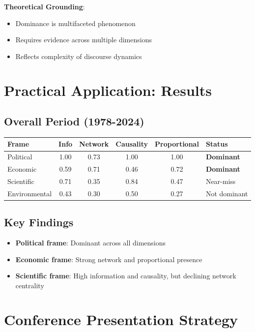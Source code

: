 \documentclass[11pt]{article}
\begin{document}
\textbf{Theoretical Grounding}:
\begin{itemize}
    \item Dominance is multifaceted phenomenon
    \item Requires evidence across multiple dimensions
    \item Reflects complexity of discourse dynamics
\end{itemize}

\section{Practical Application: Results}

\subsection{Overall Period (1978-2024)}
\begin{center}
\begin{tabular}{lccccl}
\toprule
\textbf{Frame} & \textbf{Info} & \textbf{Network} & \textbf{Causality} & \textbf{Proportional} & \textbf{Status} \\
\midrule
Political & 1.00 & 0.73 & 1.00 & 1.00 & \textbf{Dominant} \\
Economic & 0.59 & 0.71 & 0.46 & 0.72 & \textbf{Dominant} \\
Scientific & 0.71 & 0.35 & 0.84 & 0.47 & Near-miss \\
Environmental & 0.43 & 0.30 & 0.50 & 0.27 & Not dominant \\
\bottomrule
\end{tabular}
\end{center}

\subsection{Key Findings}
\begin{itemize}
    \item \textbf{Political frame}: Dominant across all dimensions
    \item \textbf{Economic frame}: Strong network and proportional presence
    \item \textbf{Scientific frame}: High information and causality, but declining network centrality
\end{itemize}

\section{Conference Presentation Strategy}
\end{document}

